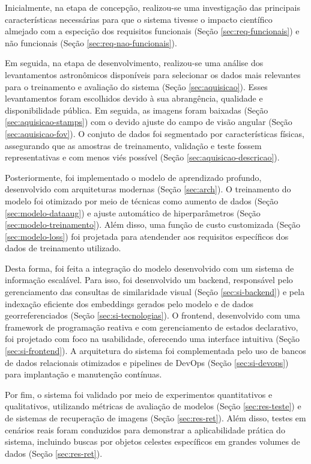 Inicialmente, na etapa de concepção, realizou-se uma investigação das principais características necessárias para que o sistema tivesse o impacto científico almejado com a especição dos requisitos funcionais (Seção \ref{sec:req-funcionais}) e não funcionais (Seção \ref{sec:req-nao-funcionais}).

Em seguida, na etapa de desenvolvimento, realizou-se uma análise dos levantamentos astronômicos disponíveis para selecionar os dados mais relevantes para o treinamento e avaliação do sistema (Seção \ref{sec:aquisicao}). Esses levantamentos foram escolhidos devido à sua abrangência, qualidade e disponibilidade pública. Em seguida, as imagens foram baixadas (Seção \ref{sec:aquisicao-stamps}) com o devido ajuste do campo de visão angular (Seção \ref{sec:aquisicao-fov}). O conjuto de dados foi segmentado por características físicas, assegurando que as amostras de treinamento, validação e teste fossem representativas e com menos viés possível (Seção \ref{sec:aquisicao-descricao}).

Posteriormente, foi implementado o modelo de aprendizado profundo, desenvolvido com arquiteturas modernas (Seção \ref{sec:arch}). O treinamento do modelo foi otimizado por meio de técnicas como aumento de dados (Seção \ref{sec:modelo-dataaug}) e ajuste automático de hiperparâmetros (Seção \ref{sec:modelo-treinamento}). Além disso, uma função de custo customizada (Seção \ref{sec:modelo-loss}) foi projetada para atendender aos requisitos específicos dos dados de treinamento utilizado.

Desta forma, foi feita a integração do modelo desenvolvido com um sistema de informação escalável. Para isso, foi desenvolvido um backend, responsável pelo gerenciamento das consultas de similaridade visual (Seção \ref{sec:si-backend}) e pela indexação eficiente dos embeddings gerados pelo modelo e de dados georreferenciados (Seção \ref{sec:si-tecnologias}). O frontend, desenvolvido com uma framework de programação reativa e com gerenciamento de estados declarativo, foi projetado com foco na usabilidade, oferecendo uma interface intuitiva (Seção \ref{sec:si-frontend}). A arquitetura do sistema foi complementada pelo uso de bancos de dados relacionais otimizados e pipelines de DevOps (Seção \ref{sec:si-devops}) para implantação e manutenção contínuas.

Por fim, o sistema foi validado por meio de experimentos quantitativos e qualitativos, utilizando métricas de avaliação de modelos (Seção \ref{sec:res-teste}) e de sistemas de recuperação de imagens (Seção \ref{sec:res-ret}). Além disso, testes em cenários reais foram conduzidos para demonstrar a aplicabilidade prática do sistema, incluindo buscas por objetos celestes específicos em grandes volumes de dados (Seção \ref{sec:res-ret}).

